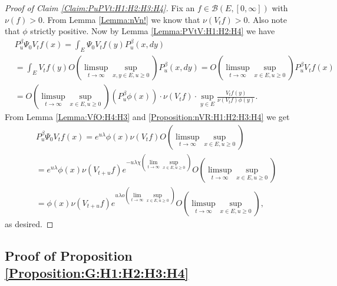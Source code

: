 \documentclass[12pt,a4paper]{amsart}
\numberwithin{equation}{section}
\theoremstyle{plain}
\theoremstyle{definition}
\theoremstyle{remark}
\begin{document}
\begin{proof}[Proof of Claim \ref{Claim:PuPVt:H1:H2:H3:H4}]
Fix an $f\in \mathcal B(E,[0,\infty])$ with $\nu(f)>0$. 
From Lemma \ref{Lemma:nVn!} we know that $\nu(V_tf)>0$. 
Also note that $\phi$ strictly positive. 
Now by Lemma \ref{Lemma:PVtV:H1:H2:H4}  we have
\begin{align}
 &P_u^\beta \Psi_0 V_{t} f(x) 
 = \int_{E} \Psi_0V_tf(y) P_u^\beta (x,dy)
 \\&=\int_{E} V_tf(y) O(\limsup_{t\to \infty} \sup_{x,y\in E, u\geq 0}) P_u^\beta (x,dy)
 = O(\limsup_{t\to \infty}\sup_{x\in E,u\geq 0}) P_u^\beta V_t f(x)
 \\&= O(\limsup_{t\to \infty}\sup_{x\in E,u\geq 0}) (P_u^\beta \phi(x)) \cdot \nu(V_{t}f) \cdot\sup_{y\in E} \frac{V_tf(y)}{\nu(V_{t}f)\phi(y)}.
 \end{align}
From Lemma \ref{Lemma:VfO:H4:H3} and \ref{Proposition:nVR:H1:H2:H3:H4} we get
\begin{align}
 &P_u^\beta \Psi_0 V_{t} f(x)
 = e^{u\lambda} \phi(x) \nu(V_tf)O(\limsup_{t\to \infty} \sup_{x\in E, u \geq 0})
 \\&= e^{u\lambda }\phi(x)\nu(V_{t+u}f) e^{-u \lambda \chi(\lim_{t\to \infty} \sup_{x\in E, u\geq 0})} O(\limsup_{t\to \infty} \sup_{x\in E, u\geq 0})
 \\&= \phi(x) \nu(V_{t+u}f) e^{u\lambda o(\lim_{t\to \infty} \sup_{x\in E, u\geq 0})} O(\limsup_{t\to \infty}\sup_{x\in E, u\geq 0}),
 \end{align}
as desired.
\end{proof}
\subsection{Proof of Proposition \ref{Proposition:G:H1:H2:H3:H4}}
\end{document}
